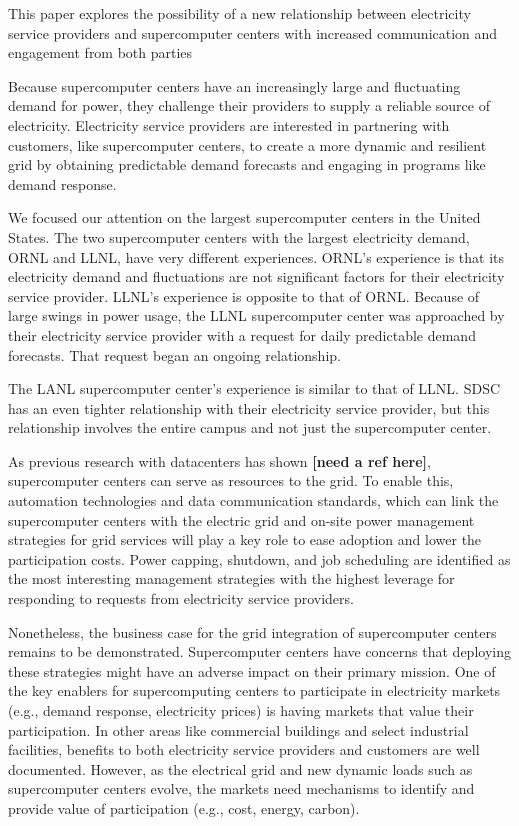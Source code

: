 This paper explores the possibility of a new relationship between electricity service providers
and supercomputer centers with increased communication and engagement from both parties

Because supercomputer centers have an increasingly large and fluctuating demand for power, they 
challenge their providers to supply a reliable source of electricity. Electricity service providers 
are interested in partnering with customers, like supercomputer centers, to create a more dynamic and resilient grid
by obtaining predictable demand forecasts and engaging in programs like demand response.

We focused our attention on the largest supercomputer centers in the United States. The two supercomputer 
centers with the largest electricity demand, ORNL and LLNL, have very different experiences.  
ORNL's experience is that its electricity demand and fluctuations are not significant factors for their 
electricity service provider.  
LLNL's experience is opposite to that of ORNL.  Because of large swings in 
power usage, the LLNL supercomputer center was approached by their electricity service provider with a 
request for daily predictable demand forecasts. That request began an ongoing relationship.  

The LANL supercomputer center's experience is similar to that of LLNL. SDSC has an even tighter relationship 
with their electricity service provider, but this relationship involves the entire campus and not just the 
supercomputer center.  

As previous research with datacenters has shown \textbf{[need a ref here]}, supercomputer centers can serve as   
resources to the grid. To enable this, automation technologies and data communication standards, 
which can link the supercomputer centers with the electric grid and on-site power management strategies 
for grid services will play a key role to ease adoption and lower the participation costs.  Power capping, 
shutdown, and job scheduling are identified as the most interesting management strategies with the highest 
leverage for responding to requests from electricity service providers.  

Nonetheless, the business case for the grid integration of supercomputer centers remains to be demonstrated.  
Supercomputer centers have concerns that deploying these strategies might have an adverse impact on 
their primary mission. One of the key enablers for supercomputing centers to participate in 
electricity markets (e.g., demand response, electricity prices) is having markets that value their 
participation. In other areas like commercial buildings and select industrial facilities, benefits to 
both electricity service providers and customers are well documented. However, as the electrical grid 
and new dynamic loads such as supercomputer centers evolve, the markets need mechanisms to identify 
and provide value of participation (e.g., cost, energy, carbon).

